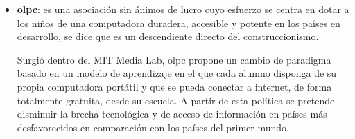 \begin{itemize}
    





\item \textbf{\Gls{olpc}}: es una asociación sin ánimos de lucro cuyo esfuerzo
    se centra en dotar a los niños de una computadora duradera, accesible y
    potente en los países en desarrollo, se dice que es un descendiente directo
    del construccionismo\cite{papertian:const}.
	
    Surgió dentro del MIT Media Lab, \Gls{olpc} propone un cambio de paradigma
    basado en un modelo de aprendizaje en el que cada alumno disponga de su
    propia computadora portátil y que se pueda conectar a internet, de forma
    totalmente gratuita, desde su escuela. A partir de esta política se pretende
    disminuir la brecha tecnológica y de acceso de información en países más
    desfavorecidos en comparación con los países del primer
    mundo\cite{videojuegos:gonzaleztardon}.
	

\end{itemize}
